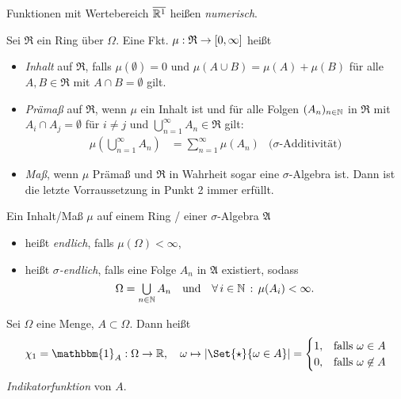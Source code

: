 \documentclass{cheat-sheet}
\newcommand{\Alg}{\mathfrak{A}} %
\newcommand{\Ring}{\mathfrak{R}} %
\newcommand{\ind}{\mathbbm{1}} %
\renewcommand{\ER}{\overline{\R^1}} %
\begin{document}
\begin{defn}
  Funktionen mit Wertebereich $\ER$ heißen \emph{numerisch}.
\end{defn}

\begin{defn}
  Sei $\Ring$ ein Ring über $\Omega$. Eine Fkt. $\mu : \Ring \to \cinterval{0}{\infty}$ heißt
  \begin{itemize}
    \item \emph{Inhalt} auf $\Ring$, falls $\mu(\emptyset) = 0$ und $\mu(A \cup B) = \mu(A) + \mu(B)$ für alle $A, B \in \Ring$ mit $A \cap B = \emptyset$ gilt.
    \item \emph{Prämaß} auf $\Ring$, wenn $\mu$ ein Inhalt ist und für alle Folgen $(A_n)_{n \in \mathbb{N}}$ in $\Ring$ mit $A_i \cap A_j = \emptyset$ für $i \not= j$ und $\bigcup_{n=1}^\infty A_n \in \Ring$ gilt:
    \begin{align*}
      \mu \left( \bigcup_{n=1}^\infty A_n \right) &= \sum_{n=1}^\infty \mu(A_n) & \text{($\sigma$-Additivität)}
    \end{align*}
    \item \emph{Maß}, wenn $\mu$ Prämaß und $\Ring$ in Wahrheit sogar eine $\sigma$-Algebra ist. Dann ist die letzte Vorraussetzung in Punkt 2 immer erfüllt.
  \end{itemize}
\end{defn}

\begin{defn}
  Ein Inhalt/Maß $\mu$ auf einem Ring / einer $\sigma$-Algebra $\Alg$
  \begin{itemize}
    \item heißt \emph{endlich}, falls $\mu(\Omega) < \infty$,
    \item heißt \emph{$\sigma$-endlich}, falls eine Folge $A_n$ in $\Alg$ existiert, sodass
    \[ \Omega = \bigcup_{n \in \N} A_n \quad \text{und} \quad \fa{i \in \N} \mu(A_i) < \infty. \]
  \end{itemize}
\end{defn}

\begin{nota}
  Sei $\Omega$ eine Menge, $A \subset \Omega$. Dann heißt
  \[ \chi_1 = \ind_A : \Omega \to \R, \quad \omega \mapsto \abs{\Set{ \star }{ \omega \in A }} =
  \begin{cases}
    1, & \text{falls } \omega \in A \\
    0, & \text{falls } \omega \not\in A
  \end{cases} \]
  \emph{Indikatorfunktion} von $A$.
\end{nota}
\end{document}
